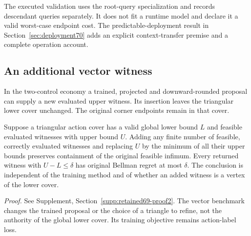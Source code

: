 The executed validation uses the root-query specialization and records descendant queries separately. It does not fit a runtime model and declare it a valid worst-case endpoint cost. The predictable-deployment result in Section~\ref{sec:deployment70} adds an explicit context-transfer premise and a complete operation account.

\subsection{An additional vector witness}
In the two-control economy a trained, projected and downward-rounded proposal can supply a new evaluated upper witness. Its insertion leaves the triangular lower cover unchanged. The original corner endpoints remain in that cover.
\begin{proposition}\label{prop:vector-witness69}
Suppose a triangular action cover has a valid global lower bound $L$ and feasible evaluated witnesses with upper bound $U$. Adding any finite number of feasible, correctly evaluated witnesses and replacing $U$ by the minimum of all their upper bounds preserves containment of the original feasible infimum. Every returned witness with $U-L\le\delta$ has original Bellman regret at most $\delta$. The conclusion is independent of the training method and of whether an added witness is a vertex of the lower cover.
\end{proposition}
\noindent\emph{Proof.} See Supplement, Section~\ref{supp:retained69-proof2}.
The vector benchmark changes the trained proposal or the choice of a triangle to refine, not the authority of the global lower cover. Its training objective remains action-label loss.
